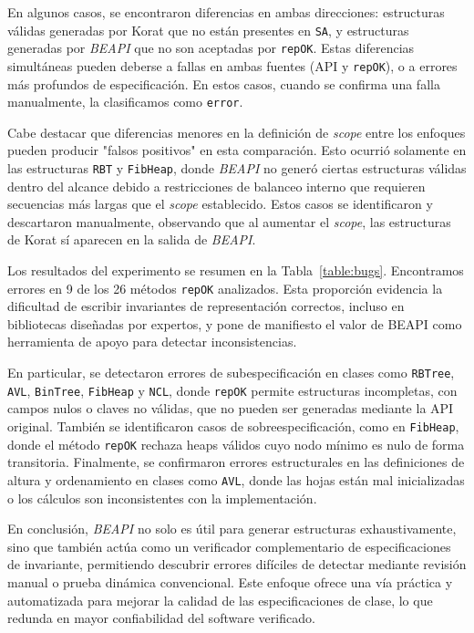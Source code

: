 En algunos casos, se encontraron diferencias en ambas direcciones: estructuras válidas generadas por 
\textsf{Korat} que no están presentes en \texttt{SA}, y estructuras generadas por \emph{BEAPI} que 
no son aceptadas por \texttt{repOK}. Estas diferencias simultáneas pueden deberse a fallas en ambas 
fuentes (API y \texttt{repOK}), o a errores más profundos de especificación. En estos casos, cuando se 
confirma una falla manualmente, la clasificamos como \texttt{error}.

Cabe destacar que diferencias menores en la definición de \emph{scope} entre los enfoques pueden 
producir "falsos positivos" en esta comparación. Esto ocurrió solamente en las estructuras 
\texttt{RBT} y \texttt{FibHeap}, donde \emph{BEAPI} no generó ciertas estructuras válidas dentro del 
alcance debido a restricciones de balanceo interno que requieren secuencias más largas que el 
\emph{scope} establecido. Estos casos se identificaron y descartaron manualmente, observando que al 
aumentar el \emph{scope}, las estructuras de \textsf{Korat} sí aparecen en la salida de \emph{BEAPI}.

Los resultados del experimento se resumen en la Tabla~\ref{table:bugs}. Encontramos errores en 9 de 
los 26 métodos \texttt{repOK} analizados. Esta proporción evidencia la dificultad de escribir 
invariantes de representación correctos, incluso en bibliotecas diseñadas por expertos, y pone de 
manifiesto el valor de \textsf{BEAPI} como herramienta de apoyo para detectar inconsistencias.

En particular, se detectaron errores de subespecificación en clases como \texttt{RBTree}, \texttt{AVL}, 
\texttt{BinTree}, \texttt{FibHeap} y \texttt{NCL}, donde \texttt{repOK} permite estructuras 
incompletas, con campos nulos o claves no válidas, que no pueden ser generadas mediante la API 
original. También se identificaron casos de sobreespecificación, como en \texttt{FibHeap}, donde 
el método \texttt{repOK} rechaza heaps válidos cuyo nodo mínimo es nulo de forma transitoria. 
Finalmente, se confirmaron errores estructurales en las definiciones de altura y ordenamiento en 
clases como \texttt{AVL}, donde las hojas están mal inicializadas o los cálculos son inconsistentes 
con la implementación.

En conclusión, \emph{BEAPI} no solo es útil para generar estructuras exhaustivamente, sino que 
también actúa como un verificador complementario de especificaciones de invariante, permitiendo 
descubrir errores difíciles de detectar mediante revisión manual o prueba dinámica convencional. 
Este enfoque ofrece una vía práctica y automatizada para mejorar la calidad de las especificaciones 
de clase, lo que redunda en mayor confiabilidad del software verificado.

